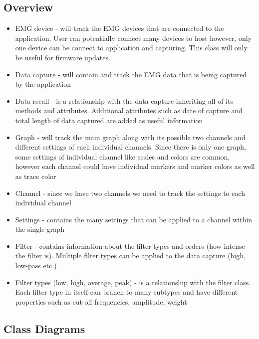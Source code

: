 \documentclass[12pt,a4paper]{article}
\begin{document}
\subsection{Overview}

\begin{itemize}
	\item EMG device - will track the EMG devices that are connected to the application. User can potentially connect many devices to host however, only one device can be connect to application and capturing.
						This class will only be useful for firmware updates. 
	\item Data capture - will contain and track the EMG data that is being captured by the application
	\item Data recall - is a relationship with the data capture inheriting all of its methods and attributes. 
						Additional attributes such as date of capture and total length of data captured are added as useful information
	\item Graph - will track the main graph along with its possible two channels and different settings of each individual channels. 
						Since there is only one graph, some settings of individual channel like scales and colors are common, however each channel could have individual markers and marker colors as well as trace color
	\item Channel - since we have two channels we need to track the settings to each individual channel
	\item Settings - contains the many settings that can be applied to a channel within the single graph
	\item Filter - contains information about the filter types and orders (how intense the filter is). Multiple filter types can be applied to the data capture (high, low-pass etc.)
	\item Filter types (low, high, average, peak) - is a relationship with the filter class. Each filter type in itself can branch to many subtypes and have different properties such as cut-off frequencies, amplitude, weight
\end{itemize}

\newpage

\subsection{Class Diagrams}
\end{document}

